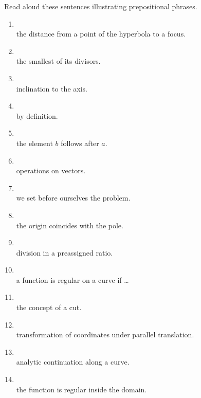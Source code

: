 \begin{keybox}[Exercise 3.7]
Read aloud these sentences illustrating prepositional phrases.
\end{keybox}

\begin{enumerate}[label=\arabic*)]
\item {}\\
      the distance from a point of the hyperbola to a focus.
\item {}\\
      the smallest of its divisors.
\item {}\\
      inclination to the axis.
\item {}\\
      by definition.
\item {}\\
      the element $b$ follows after $a$.
\item {}\\
      operations on vectors.
\item {}\\
      we set before ourselves the problem.
\item {}\\
      the origin coincides with the pole.
\item {}\\
      division in a preassigned ratio.
\item {}\\
      a function is regular on a curve if \ldots
\item {}\\
      the concept of a cut.
\item {}\\
      transformation of coordinates under parallel translation.
\item {}\\
      analytic continuation along a curve.
\item {}\\
      the function is regular inside the domain.

\end{enumerate}
